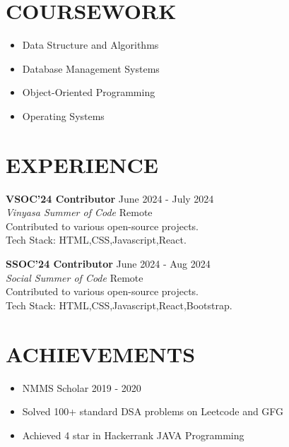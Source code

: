 \documentclass[a4paper,10pt]{article}
\begin{document}
	\vspace{0.2cm}
	
	\section*{COURSEWORK}
	\begin{multicols}{2}
		\begin{itemize}[noitemsep]
			\item Data Structure and Algorithms
			\item Database Management Systems
			\item Object-Oriented Programming
			\item Operating Systems
			
		\end{itemize}
	\end{multicols}
	
	\vspace{0.2cm}
	
	\section*{EXPERIENCE}
	\vspace{0.2cm}
	
	\noindent\textbf{VSOC'24 Contributor} \hfill June 2024 - July 2024 \\
	\textit{Vinyasa Summer of Code} \hfill Remote \\
	Contributed to various open-source projects. \\
	Tech Stack: HTML,CSS,Javascript,React.
	
	\vspace{0.3cm}
	
	
	\noindent\textbf{SSOC'24 Contributor} \hfill June 2024 - Aug 2024 \\
	\textit{Social Summer of Code} \hfill Remote \\
	Contributed to various open-source projects. \\
	Tech Stack: HTML,CSS,Javascript,React,Bootstrap.
	
	
	\vspace{0.2cm}
	
	\section*{ACHIEVEMENTS}
	\vspace{0.2cm}
	
	\begin{itemize}[noitemsep]
		\item NMMS Scholar 2019 - 2020
		\item Solved 100+ standard DSA problems on Leetcode and GFG
		\item Achieved 4 star in Hackerrank JAVA Programming
	\end{itemize}
	
\end{document}
